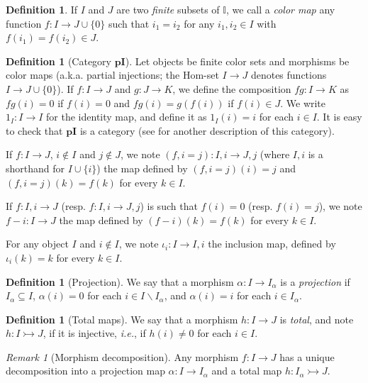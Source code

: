\documentclass[english]{PaperTools/latex/entcs}
\theoremstyle{plain}
\theoremstyle{definition}
\newtheorem{definition}[theorem]{Definition}
\theoremstyle{remark}
\newtheorem*{remark}{Remark}
\def\pI{\ensuremath{\mathbf{pI}}}
\def\ie{\textit{i.e.}}
\begin{document}
\begin{definition}
  If $I$ and $J$ are two \emph{finite} subsets of $𝕀$, we call a
  \emph{color map} any function $f : I → J ∪ \{0\}$ such that
  $i_1 = i_2$ for any $i_1, i_2 ∈ I$ with $f(i_1) = f(i_2) ∈ J$.
\end{definition}

\begin{definition}[Category $\pI{}$]
  \label{def:pI}
  Let objects be finite color sets and morphisms be color maps
  (a.k.a. partial injections; the Hom-set $I → J$ denotes functions $I → J ∪ \{0\}$).
  If $f : I → J$ and $g : J → K$, we define the composition $fg : I → K$
  as $fg(i) = 0$ if $f(i) = 0$ and $fg(i) = g(f(i))$ if $f(i) ∈ J$.
  We write $1_I : I → I$ for the identity map, and define it as $1_I(i) = i$ for each $i ∈ I$.
  It is easy to check that \pI{} is a category (see \cite[ex.~9.7
  p.~176]{PittsAM:nomsns} for another description of this category).
\end{definition}

If $f : I → J$, $i ∉ I$ and $j ∉ J$, we note
$(f, i = j) : I,i → J,j$ (where $I,i$ is a shorthand for $I ∪ \{i\}$)
the map defined by $(f,i=j)(i) = j$ and
$(f,i=j)(k) = f(k)$ for every $k ∈ I$.

If $f : I,i → J$ (resp. $f : I,i → J,j$) is such that $f(i) = 0$ (resp.
$f(i) = j$), we note $f-i : I → J$ the map defined by $(f-i)(k) = f(k)$
for every $k ∈ I$.

For any object $I$ and $i ∉ I$, we note $ι_i : I → I,i$ the inclusion
map, defined by $ι_i(k) = k$ for every $k ∈ I$.

\begin{definition}[Projection]
   We say that a morphism $α : I → I_α$ is a \emph{projection} if
   $I_α ⊆ I$,
   $α(i) = 0$ for each $i ∈ I \backslash I_α$, and
   $α(i) = i$ for each $i ∈ I_α$.
\end{definition}
\begin{definition}[Total maps]
   We say that a morphism $h : I → J$ is \emph{total}, and note $h : I ↣ J$,
   if it is injective, \ie, if $h(i) ≠ 0$ for each $i ∈ I$.
\end{definition}
\begin{remark}[Morphism decomposition]
  Any morphism $f : I → J$ has a
  unique decomposition into a projection map
  $α : I → I_α$ and a total map $h : I_α ↣ J$.
%
\end{remark}
\end{document}
